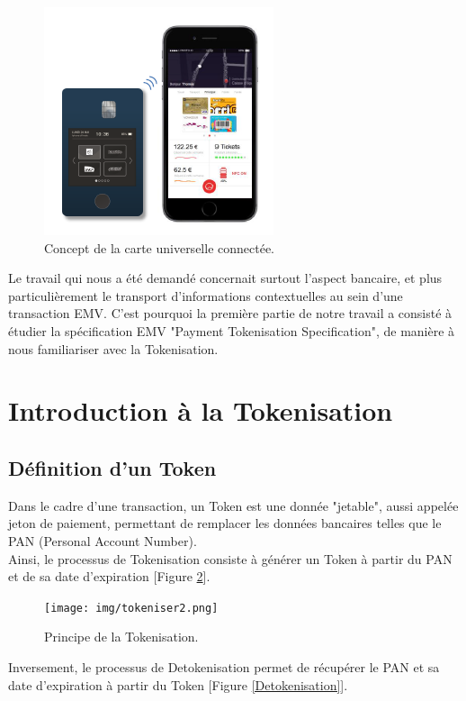 \documentclass{report}
\begin{document}
\begin{figure}[!h]
    \centering
			\includegraphics[scale=0.5]{img/carte.png}
			\caption{\label{Carte} Concept de la carte universelle connectée.}			
\end{figure}

Le travail qui nous a été demandé concernait surtout l'aspect bancaire, et plus particulièrement le transport d'informations contextuelles au sein d'une transaction EMV. C'est pourquoi la première partie de notre travail a consisté à étudier la spécification EMV "Payment Tokenisation Specification", de manière à nous familiariser avec la Tokenisation.


\section{Introduction à la Tokenisation}
\subsection{Définition d'un Token}
Dans le cadre d'une transaction, un Token est une donnée "jetable", aussi appelée jeton de paiement, permettant de remplacer les données bancaires telles que le PAN (Personal Account Number).\\
Ainsi, le processus de Tokenisation consiste à générer un Token à partir du PAN et de sa date d'expiration [Figure \ref{Tokenisation}].

\begin{figure}[!h]
    \centering
			\texttt{[image: img/tokeniser2.png]}
			\caption{\label{Tokenisation} Principe de la Tokenisation.}			
\end{figure}

Inversement, le processus de Detokenisation permet de récupérer le PAN et sa date d'expiration à partir du Token [Figure \ref{Detokenisation}]. 
\end{document}
